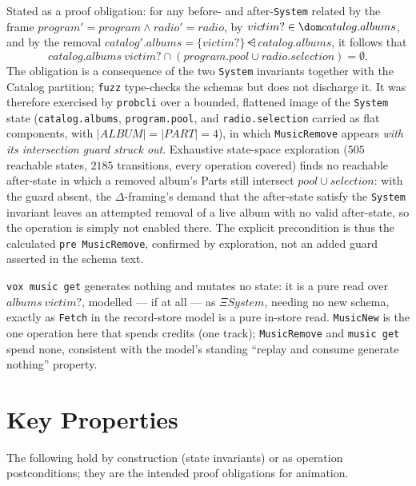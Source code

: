 \documentclass[a4paper,10pt,fleqn]{article}
\begin{document}
Stated as a proof obligation: for any before- and after-\texttt{System} related
by the frame $program' = program \land radio' = radio$, by
$victim? \in \dom catalog.albums$, and by the removal
$catalog'.albums = \{victim?\} \ndres catalog.albums$, it follows that
\[
  catalog.albums~victim? \cap (program.pool \cup radio.selection) = \emptyset.
\]
The obligation is a consequence of the two \texttt{System} invariants together
with the Catalog partition; \texttt{fuzz} type-checks the schemas but does not
discharge it. It was therefore exercised by \texttt{probcli} over a bounded,
flattened image of the \texttt{System} state (\texttt{catalog.albums},
\texttt{program.pool}, and \texttt{radio.selection} carried as flat components,
with $|ALBUM| = |PART| = 4$), in which \texttt{MusicRemove} appears \emph{with
its intersection guard struck out}. Exhaustive state-space exploration ($505$
reachable states, $2185$ transitions, every operation covered) finds no
reachable after-state in which a removed album's Parts still intersect
$pool \cup selection$: with the guard absent, the $\Delta$-framing's demand that
the after-state satisfy the \texttt{System} invariant leaves an attempted
removal of a live album with no valid after-state, so the operation is simply
not enabled there. The explicit precondition is thus the calculated
\texttt{pre}~\texttt{MusicRemove}, confirmed by exploration, not an added guard
asserted in the schema text.

\texttt{vox music get} generates nothing and mutates no state: it is a pure read
over $albums~victim?$, modelled --- if at all --- as \texttt{$\Xi System$},
needing no new schema, exactly as \texttt{Fetch} in the record-store model is a
pure in-store read. \texttt{MusicNew} is the one operation here that spends
credits (one track); \texttt{MusicRemove} and \texttt{music get} spend none,
consistent with the model's standing ``replay and consume generate nothing''
property.

\section{Key Properties}

The following hold by construction (state invariants) or as operation
postconditions; they are the intended proof obligations for animation.
\end{document}
